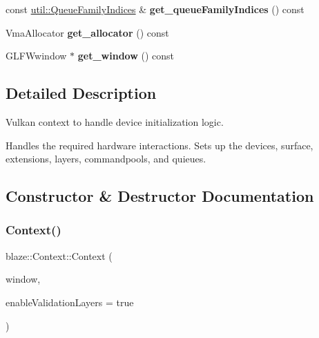 \begin{Indent}
\begin{DoxyCompactItemize}
\item 
\mbox{\label{classblaze_1_1Context_a185415599915cdad56b175067919c4fc}} 
const \hyperlink{structblaze_1_1util_1_1QueueFamilyIndices}{util\+::\+Queue\+Family\+Indices} \& {\bfseries get\+\_\+queue\+Family\+Indices} () const
\item 
\mbox{\label{classblaze_1_1Context_ac9ed2ee3986e4a42503398c38fd199ee}} 
Vma\+Allocator {\bfseries get\+\_\+allocator} () const
\item 
\mbox{\label{classblaze_1_1Context_a05d84cc0bbba2a0df5939c5454443feb}} 
G\+L\+F\+Wwindow $\ast$ {\bfseries get\+\_\+window} () const
\end{DoxyCompactItemize}
\end{Indent}


\subsection{Detailed Description}
Vulkan context to handle device initialization logic. 

Handles the required hardware interactions. Sets up the devices, surface, extensions, layers, commandpools, and quieues. 

\subsection{Constructor \& Destructor Documentation}
\mbox{\label{classblaze_1_1Context_aadc385721ead1b5da60e0fa1a1447d48}} 
\subsubsection{\texorpdfstring{Context()}{Context()}}
{\footnotesize\ttfamily blaze\+::\+Context\+::\+Context (\begin{DoxyParamCaption}\item[{G\+L\+F\+Wwindow $\ast$}]{window,  }\item[{bool}]{enable\+Validation\+Layers = {\ttfamily true} }\end{DoxyParamCaption})\hspace{0.3cm}{\ttfamily [noexcept]}}



